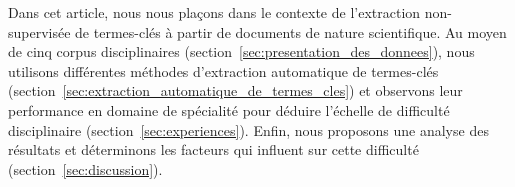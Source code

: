   Dans cet article, nous nous plaçons dans le contexte de l'extraction
  non-supervisée de termes-clés à partir de documents de nature scientifique.
  Au moyen de cinq corpus disciplinaires
  (section~\ref{sec:presentation_des_donnees}), nous utilisons
  différentes méthodes d'extraction automatique de termes-clés
  (section~\ref{sec:extraction_automatique_de_termes_cles}) et observons leur
  performance en domaine de spécialité pour déduire l'échelle de difficulté
  disciplinaire (section~\ref{sec:experiences}). Enfin, nous proposons une
  analyse des résultats et déterminons les facteurs qui influent sur cette
  difficulté (section~\ref{sec:discussion}).

